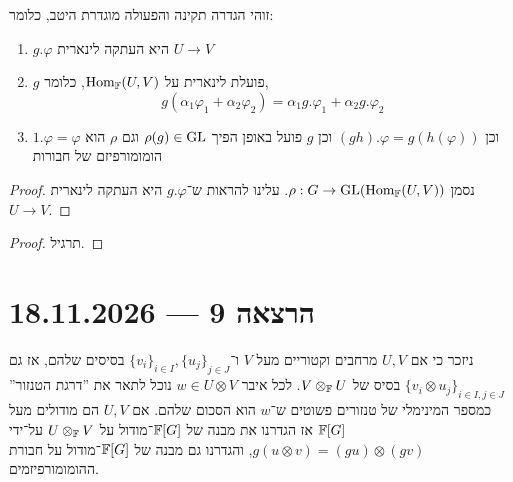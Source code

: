 \begin{proposition}
	זוהי הגדרה תקינה והפעולה מוגדרת היטב, כלומר:
	\begin{enumerate}
		\item $g . \varphi$ היא העתקה לינארית $U \to V$
		\item $g$ פועלת לינארית על $\operatorname{Hom}_{\mathbb{F}}(U, V)$, כלומר,
			\[
				g(\alpha_1 \varphi_1 + \alpha_2 \varphi_2)
				= \alpha_1 g . \varphi_1 + \alpha_2 g . \varphi_2
			\]
		\item $1 . \varphi = \varphi$ וכן $(g h) . \varphi = g(h(\varphi))$ וכן $g$ פועל באופן הפיך $\rho(g) \in \operatorname{GL}$ וגם $\rho$ הוא הומומורפיזם של חבורות
	\end{enumerate}
\end{proposition}
\begin{proof}
	נסמן $\rho : G \to \operatorname{GL}(\operatorname{Hom}_{\mathbb{F}}(U, V))$.
	עלינו להראות ש־$g . \varphi$ היא העתקה לינארית $U \to V$.
\end{proof}
\begin{proof}
	תרגיל.
\end{proof}

\section{הרצאה 9 --- 18.11.2026}
ניזכר כי אם $U, V$ מרחבים וקטוריים מעל $V$ ו־${\{ v_i \}}_{i \in I}, {\{ u_j \}}_{j \in J}$ בסיסים שלהם, אז גם ${\{ v_i \otimes u_j \}}_{i \in I, j \in J}$ בסיס של $V \otimes_{\mathbb{F}} U$.
לכל איבר $w \in U \otimes V$ נוכל לתאר את ''דרגת הטנזור'' כמספר המינימלי של טנזורים פשוטים ש־$w$ הוא הסכום שלהם.
אם $U, V$ הם מודולים מעל $\mathbb{F}[G]$ אז הגדרנו את מבנה של $\mathbb{F}[G]$־מודול על $U \otimes_{\mathbb{F}} V$ על־ידי $g(u \otimes v) = (g u) \otimes (g v)$, והגדרנו גם מבנה של $\mathbb{F}[G]$־מודול על חבורת ההומומורפיזמים.

